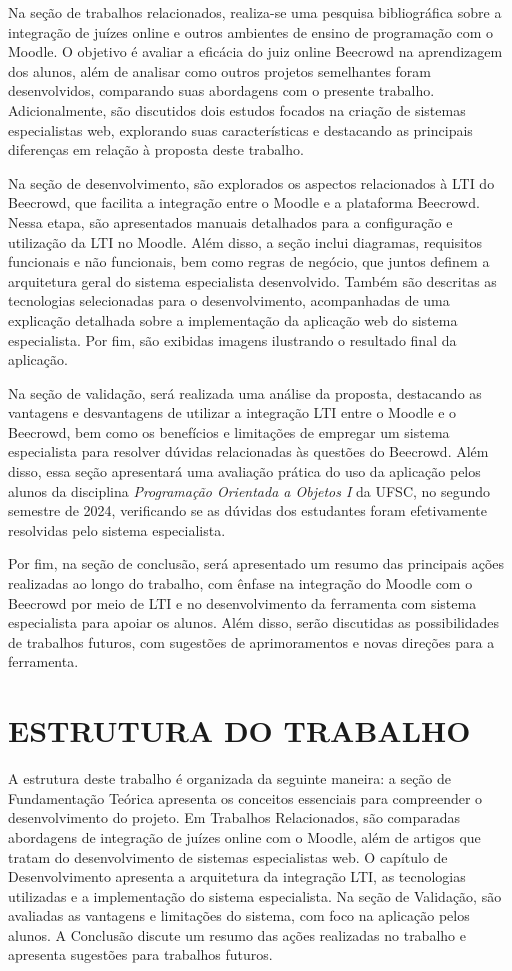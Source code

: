 Na seção de trabalhos relacionados, realiza-se uma pesquisa bibliográfica sobre a integração de juízes online e outros ambientes de ensino de programação com o Moodle. O objetivo é avaliar a eficácia do juiz online Beecrowd na aprendizagem dos alunos, além de analisar como outros projetos semelhantes foram desenvolvidos, comparando suas abordagens com o presente trabalho. Adicionalmente, são discutidos dois estudos focados na criação de sistemas especialistas web, explorando suas características e destacando as principais diferenças em relação à proposta deste trabalho.

Na seção de desenvolvimento, são explorados os aspectos relacionados à LTI do Beecrowd, que facilita a integração entre o Moodle e a plataforma Beecrowd. Nessa etapa, são apresentados manuais detalhados para a configuração e utilização da LTI no Moodle. Além disso, a seção inclui diagramas, requisitos funcionais e não funcionais, bem como regras de negócio, que juntos definem a arquitetura geral do sistema especialista desenvolvido. Também são descritas as tecnologias selecionadas para o desenvolvimento, acompanhadas de uma explicação detalhada sobre a implementação da aplicação web do sistema especialista. Por fim, são exibidas imagens ilustrando o resultado final da aplicação.

Na seção de validação, será realizada uma análise da proposta, destacando as vantagens e desvantagens de utilizar a integração LTI entre o Moodle e o Beecrowd, bem como os benefícios e limitações de empregar um sistema especialista para resolver dúvidas relacionadas às questões do Beecrowd. Além disso, essa seção apresentará uma avaliação prática do uso da aplicação pelos alunos da disciplina \textit{Programação Orientada a Objetos I} da UFSC, no segundo semestre de 2024, verificando se as dúvidas dos estudantes foram efetivamente resolvidas pelo sistema especialista.

Por fim, na seção de conclusão, será apresentado um resumo das principais ações realizadas ao longo do trabalho, com ênfase na integração do Moodle com o Beecrowd por meio de LTI e no desenvolvimento da ferramenta com sistema especialista para apoiar os alunos. Além disso, serão discutidas as possibilidades de trabalhos futuros, com sugestões de aprimoramentos e novas direções para a ferramenta.

\section{ESTRUTURA DO TRABALHO}

A estrutura deste trabalho é organizada da seguinte maneira: a seção de Fundamentação Teórica apresenta os conceitos essenciais para compreender o desenvolvimento do projeto. Em Trabalhos Relacionados, são comparadas abordagens de integração de juízes online com o Moodle, além de artigos que tratam do desenvolvimento de sistemas especialistas web. O capítulo de Desenvolvimento apresenta a arquitetura da integração LTI, as tecnologias utilizadas e a implementação do sistema especialista. Na seção de Validação, são avaliadas as vantagens e limitações do sistema, com foco na aplicação pelos alunos. A Conclusão discute um resumo das ações realizadas no trabalho e apresenta sugestões para trabalhos futuros.
